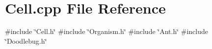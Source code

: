 \section{Cell.\+cpp File Reference}
\label{Cell_8cpp}
{\ttfamily \#include \char`\"{}Cell.\+h\char`\"{}}\newline
{\ttfamily \#include \char`\"{}Organism.\+h\char`\"{}}\newline
{\ttfamily \#include \char`\"{}Ant.\+h\char`\"{}}\newline
{\ttfamily \#include \char`\"{}Doodlebug.\+h\char`\"{}}\newline
